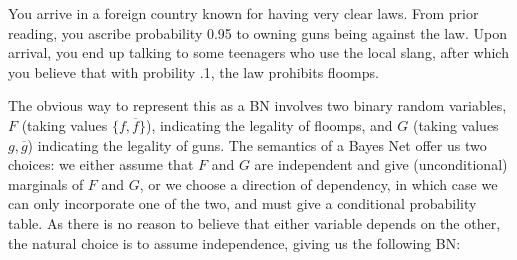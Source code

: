 \documentclass{article}
\numberwithin{equation}{section}
\begin{document}
	\begin{example}\label{ex:guns-and-floomps}
		You arrive in a foreign country known for having very clear laws. From prior reading, you ascribe probability 0.95 to owning guns being against the law. Upon arrival, you end up talking to some teenagers who use the local slang, 
		after which you believe that with probility .1, the law prohibits floomps. 
		
		The obvious way to represent this as a BN involves two binary random variables, $F$ (taking values $\{f, \overline f\}$), indicating the legality of floomps, and $G$ (taking values $g, \overline g$) indicating the legality of guns. 
		The semantics of a Bayes Net offer us two choices:
		we either assume that $F$ and $G$ are independent and give
		(unconditional) marginals of $F$ and $G$, or we choose a
		direction of dependency, in which case we can only 
		incorporate one of the two, and must give a conditional probability table.           
		As there is no reason to believe that either variable depends on the
		other, the natural choice is to assume independence, giving us the
		following BN:
		
		
		\begin{center}
		\end{center}
		

\end{example}
\end{document}
